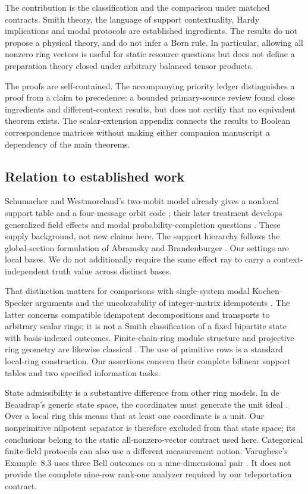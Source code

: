 \documentclass[11pt]{article}
\theoremstyle{definition}\newtheorem{definition}[theorem]{Definition}
\theoremstyle{remark}\newtheorem{remark}[theorem]{Remark}
\begin{document}
The contribution is the classification and the comparison under matched contracts. Smith theory, the language of support contextuality, Hardy implications and modal protocols are established ingredients. The results do not propose a physical theory, and do not infer a Born rule. In particular, allowing all nonzero ring vectors is useful for static resource questions but does not define a preparation theory closed under arbitrary balanced tensor products.

The proofs are self-contained. The accompanying priority ledger distinguishes a proof from a claim to precedence: a bounded primary-source review found close ingredients and different-context results, but does not certify that no equivalent theorem exists. The scalar-extension appendix connects the results to Boolean correspondence matrices without making either companion manuscript a dependency of the main theorems.

\subsection{Relation to established work}
Schumacher and Westmoreland's two-mobit model already gives a nonlocal support table and a four-message orbit code \cite{Schumacher2010}; their later treatment develops generalized field effects and modal probability-completion questions \cite{Schumacher2012}. These supply background, not new claims here. The support hierarchy follows the global-section formulation of Abramsky and Brandenburger \cite{AbramskyBrandenburger2011}. Our settings are local bases. We do not additionally require the same effect ray to carry a context-independent truth value across distinct bases.

That distinction matters for comparisons with single-system modal Kochen--Specker arguments \cite{SchumacherFreeWill} and the uncolorability of integer-matrix idempotents \cite{BenZvi2017}. The latter concerns compatible idempotent decompositions and transports to arbitrary scalar rings; it is not a Smith classification of a fixed bipartite state with basis-indexed outcomes. Finite-chain-ring module structure and projective ring geometry are likewise classical \cite{Byrne2021,Honold2009}. The use of primitive rows is a standard local-ring construction. Our assertions concern their complete bilinear support tables and two specified information tasks.

State admissibility is a substantive difference from other ring models. In de Beaudrap's generic state space, the coordinates must generate the unit ideal \cite{deBeaudrap2014}. Over a local ring this means that at least one coordinate is a unit. Our nonprimitive nilpotent separator is therefore excluded from that state space; its conclusions belong to the static all-nonzero-vector contract used here. Categorical finite-field protocols can also use a different measurement notion: Varughese's Example~8.3 uses three Bell outcomes on a nine-dimensional pair \cite{Varughese2009}. It does not provide the complete nine-row rank-one analyzer required by our teleportation contract.
\end{document}
